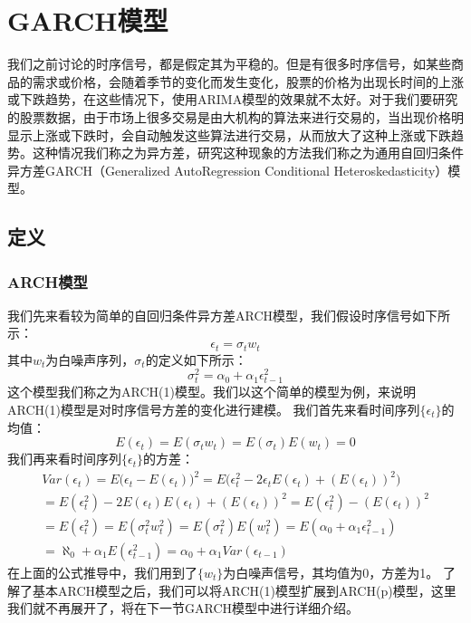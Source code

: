 \documentclass{article}
\begin{document}
\section{GARCH模型}
我们之前讨论的时序信号，都是假定其为平稳的。但是有很多时序信号，如某些商品的需求或价格，会随着季节的变化而发生变化，股票的价格为出现长时间的上涨或下跌趋势，在这些情况下，使用ARIMA模型的效果就不太好。对于我们要研究的股票数据，由于市场上很多交易是由大机构的算法来进行交易的，当出现价格明显示上涨或下跌时，会自动触发这些算法进行交易，从而放大了这种上涨或下跌趋势。这种情况我们称之为异方差，研究这种现象的方法我们称之为通用自回归条件异方差GARCH（Generalized AutoRegression Conditional Heteroskedasticity）模型。
\subsection{定义}
\subsubsection{ARCH模型}
我们先来看较为简单的自回归条件异方差ARCH模型，我们假设时序信号如下所示：
\begin{equation}
\epsilon _{t} = \sigma _{t} w_{t}
\label{e000050}
\end{equation}
其中$w_{t}$为白噪声序列，$\sigma _{t}$的定义如下所示：
\begin{equation}
\sigma _{t}^{2} = \alpha _{0} + \alpha _{1} \epsilon _{t-1}^{2}
\label{e000051}
\end{equation}
这个模型我们称之为ARCH(1)模型。我们以这个简单的模型为例，来说明ARCH(1)模型是对时序信号方差的变化进行建模。
我们首先来看时间序列$\{ \epsilon _{t} \}$的均值：
\begin{equation}
E(\epsilon _{t}) = E(\sigma _t w_{t}) = E(\sigma _{t})E(w_{t})=0
\label{e000052}
\end{equation}
我们再来看时间序列$\{ \epsilon _{t} \}$的方差：
\begin{equation}
\begin{aligned}
Var(\epsilon _{t}) = E\big( \epsilon _{t} - E(\epsilon _{t}) \big)^{2} =E\big( \epsilon _{t}^{2} - 2\epsilon _{t}E(\epsilon _{t}) + (E(\epsilon _{t}))^{2} \big) \\
=E(\epsilon _{t}^{2})-2E(\epsilon _{t})E(\epsilon _{t})+(E(\epsilon _{t}))^{2}=E(\epsilon _{t}^{2})-(E(\epsilon _{t}))^{2} \\
=E(\epsilon _{t}^{2})=E(\sigma _{t}^{2}w_{t}^{2})=E(\sigma _{t}^{2})E(w_{t}^{2})=E(\alpha _{0} + \alpha _{1}\epsilon _{t-1}^{2}) \\
=\aleph _{0} + \alpha _{1}E(\epsilon _{t-1}^{2})=\alpha _{0} + \alpha _{1}Var(\epsilon _{t-1})
\end{aligned}
\label{e000053}
\end{equation}
在上面的公式推导中，我们用到了$\{ w_{t} \}$为白噪声信号，其均值为0，方差为1。\newline
了解了基本ARCH模型之后，我们可以将ARCH(1)模型扩展到ARCH(p)模型，这里我们就不再展开了，将在下一节GARCH模型中进行详细介绍。
\end{document}
